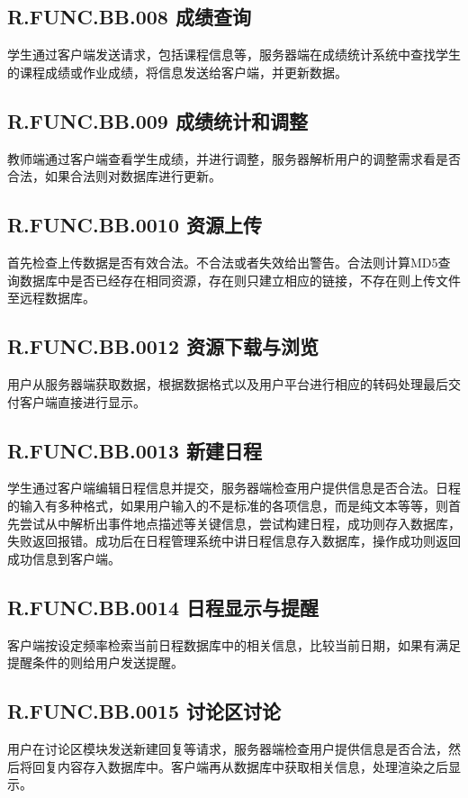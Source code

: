 \subsection{R.FUNC.BB.008   成绩查询}
学生通过客户端发送请求，包括课程信息等，服务器端在成绩统计系统中查找学生的课程成绩或作业成绩，将信息发送给客户端，并更新数据。

\subsection{R.FUNC.BB.009   成绩统计和调整}
教师端通过客户端查看学生成绩，并进行调整，服务器解析用户的调整需求看是否合法，如果合法则对数据库进行更新。

\subsection{R.FUNC.BB.0010   资源上传}
首先检查上传数据是否有效合法。不合法或者失效给出警告。合法则计算MD5查询数据库中是否已经存在相同资源，存在则只建立相应的链接，不存在则上传文件至远程数据库。

\subsection{R.FUNC.BB.0012   资源下载与浏览}
用户从服务器端获取数据，根据数据格式以及用户平台进行相应的转码处理最后交付客户端直接进行显示。

\subsection{R.FUNC.BB.0013   新建日程}
学生通过客户端编辑日程信息并提交，服务器端检查用户提供信息是否合法。日程的输入有多种格式，如果用户输入的不是标准的各项信息，而是纯文本等等，则首先尝试从中解析出事件地点描述等关键信息，尝试构建日程，成功则存入数据库，失败返回报错。成功后在日程管理系统中讲日程信息存入数据库，操作成功则返回成功信息到客户端。

\subsection{R.FUNC.BB.0014   日程显示与提醒}
客户端按设定频率检索当前日程数据库中的相关信息，比较当前日期，如果有满足提醒条件的则给用户发送提醒。

\subsection{R.FUNC.BB.0015   讨论区讨论}
用户在讨论区模块发送新建回复等请求，服务器端检查用户提供信息是否合法，然后将回复内容存入数据库中。客户端再从数据库中获取相关信息，处理渲染之后显示。

